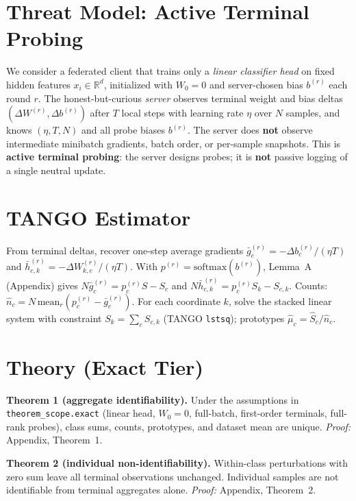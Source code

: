
\section{Threat Model: Active Terminal Probing}
\label{sec:threat}

We consider a federated client that trains only a \emph{linear classifier head}
on fixed hidden features $x_i \in \mathbb{R}^d$, initialized with $W_0=0$ and
server-chosen bias $b^{(r)}$ each round $r$.
The honest-but-curious \emph{server} observes terminal weight and bias deltas
$(\Delta W^{(r)}, \Delta b^{(r)})$ after $T$ local steps with learning rate $\eta$
over $N$ samples, and knows $(\eta, T, N)$ and all probe biases $b^{(r)}$.
The server does \textbf{not} observe intermediate minibatch gradients, batch order,
or per-sample snapshots.
This is \textbf{active terminal probing}: the server designs probes; it is
\textbf{not} passive logging of a single neutral update.

\section{TANGO Estimator}
\label{sec:tango}

From terminal deltas, recover one-step average gradients
$\bar g^{(r)}_c = -\Delta b^{(r)}_c/(\eta T)$ and
$\bar h^{(r)}_{c,k} = -\Delta W^{(r)}_{k,c}/(\eta T)$.
With $p^{(r)}=\mathrm{softmax}(b^{(r)})$, Lemma~A (Appendix) gives
$N\bar g^{(r)}_c = p^{(r)}_c S - S_c$ and
$N\bar h^{(r)}_{c,k} = p^{(r)}_c S_k - S_{c,k}$.
Counts: $\hat n_c = N\,\mathrm{mean}_r(p^{(r)}_c - \bar g^{(r)}_c)$.
For each coordinate $k$, solve the stacked linear system with constraint
$S_k=\sum_c S_{c,k}$ (TANGO \texttt{lstsq}); prototypes $\hat\mu_c=\hat S_c/\hat n_c$.

\section{Theory (Exact Tier)}
\label{sec:theory}

\textbf{Theorem 1 (aggregate identifiability).}
Under the assumptions in \texttt{theorem\_scope.exact}
(linear head, $W_0=0$, full-batch, first-order terminals, full-rank probes),
class sums, counts, prototypes, and dataset mean are unique.
\emph{Proof:} Appendix, Theorem~1.

\textbf{Theorem 2 (individual non-identifiability).}
Within-class perturbations with zero sum leave all terminal observations unchanged.
Individual samples are not identifiable from terminal aggregates alone.
\emph{Proof:} Appendix, Theorem~2.

